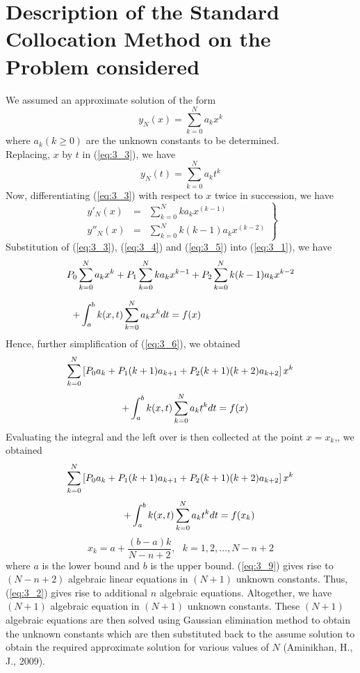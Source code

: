 \documentclass[12pt]{report}
\newcommand{\sps}{\\[0.2cm]}
\newcommand{\spn}[1]{\\[#1cm]}
\newcommand{\refn}[1]{(\ref{#1})}
\newcommand{\sprime}{'}
\newcommand{\dprime}{''}
\begin{document}
	\section{Description of the Standard Collocation Method on the Problem considered}
	We assumed an approximate solution of the form
	\begin{equation}
		y_N(x) = \sum_{k=0}^{N}a_kx^k \label{eq:3_3}
	\end{equation}
	where $a_k (k\geq 0)$ are the unknown constants to be determined.\\
	Replacing, $x$ by $t$ in \refn{eq:3_3}, we have
	\begin{equation}
		y_N(t) = \sum_{k=0}^{N}a_kt^k \label{eq:3_4}
	\end{equation}
	Now, differentiating \refn{eq:3_3} with respect to $x$ twice in succession, we have 
	\begin{equation}
		\left.\begin{array}{ccl}
			y\sprime_N(x) &=& \sum_{k=0}^{N}ka_kx^{(k-1)}\sps
			y\dprime_N(x) &=& \sum_{k=0}^{N}k(k-1)a_kx^{(k-2)}
		\end{array}\right\}
		\label{eq:3_5}
	\end{equation}
	Substitution of \refn{eq:3_3}, \refn{eq:3_4} and \refn{eq:3_5} into \refn{eq:3_1}, we have
	\begin{eqnarray}
		P_0\sum_{k=0}^{N}a_kx^k + P_1\sum_{k=0}^{N}ka_kx^{k-1} + P_2\sum_{k=0}^{N}k(k-1)a_kx^{k-2}\notag\sps
		+ \int_{a}^{b}k(x,t)\sum_{k=0}^{N}a_kx^kdt=f(x)~~~~~~~~~~~~~~~~~~~~~~~~~~~~~ \label{eq:3_6}
	\end{eqnarray}
	Hence, further simplification of \refn{eq:3_6}, we obtained
	\begin{eqnarray}
		\sum_{k=0}^{N}\left[P_0a_k + P_1(k+1)a_{k+1}+P_2(k+1)(k+2)a_{k+2}\right]x^k \notag \spn{0.1}
		+ \int_{a}^{b}k(x,t)\sum_{k=0}^{N}a_kt^kdt=f(x)~~~~~~~~~~~~~~ \label{eq:3_7}
	\end{eqnarray}
	Evaluating the integral and the left over is then collected at the point $x=x_k$,, we obtained
	\begin{eqnarray}
		\sum_{k=0}^{N}\left[P_0a_k + P_1(k+1)a_{k+1}+P_2(k+1)(k+2)a_{k+2}\right]x^k \notag \spn{0.1}
		+ \int_{a}^{b}k(x,t)\sum_{k=0}^{N}a_kt^kdt=f(x_k)~~~~~~~~~~~~ \label{eq:3_8}
	\end{eqnarray}
	\begin{equation}
		x_k = a + \frac{(b-a)k}{N-n+2}, ~~~ k=1,2,\ldots,N-n+2 \label{eq:3_9}
	\end{equation}	
	where $a$ is the lower bound and $b$ is the upper bound. \refn{eq:3_9} gives rise to $(N-n+2)$ algebraic linear equations in $(N+1)$ unknown constants. Thus, \refn{eq:3_2} gives rise to additional $n$ algebraic equations. Altogether, we have $(N+1)$  algebraic equation in $(N+1)$ unknown constants. These $(N+1)$ algebraic equations are then solved using Gaussian elimination method to obtain the unknown constants which are then substituted back to the assume solution to obtain the required approximate solution for various values of $N$ (Aminikhan, H., J., 2009).
	
\end{document}
